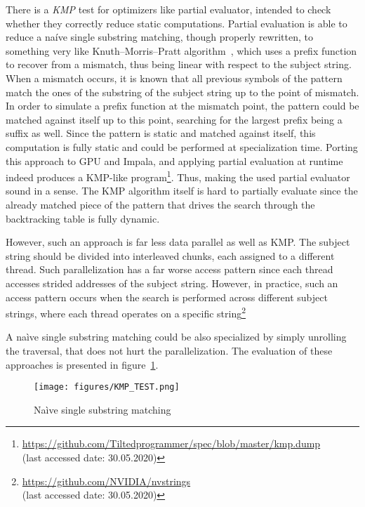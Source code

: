 There is a \emph{KMP} test for optimizers like partial evaluator,
intended to check whether they correctly reduce static computations.
Partial evaluation is able to reduce a na\'ive single substring matching,
though properly rewritten, to something very like Knuth--Morris--Pratt algorithm~\cite{KMP-Danvy},
which uses a prefix function to recover from a mismatch, thus being linear with
respect to the subject string.
When a mismatch occurs, it is known that all previous symbols of the pattern
match the ones of the substring of the subject string up to the point of mismatch.
In order to simulate a prefix function at the mismatch point, the pattern could be
matched against itself up to this point, searching for the largest prefix being a
suffix as well.
Since the pattern is static and matched against itself, this computation is fully static
and could be performed at specialization time.
Porting this approach to GPU and Impala, and applying partial evaluation
at runtime indeed produces a KMP-like program\footnote{\url{https://github.com/Tiltedprogrammer/spec/blob/master/kmp.dump}\\ (last accessed date: 30.05.2020)}.
Thus, making the used partial evaluator sound in a sense. The KMP algorithm itself is hard to partially evaluate since the already matched piece of the pattern
that drives the search through the backtracking table is fully dynamic.

However, such an approach is far less data parallel as well as KMP. The subject
string should be divided into interleaved chunks, each assigned to a different
thread. Such parallelization has a far worse access pattern since each
thread accesses strided addresses of the subject string.
However, in practice, such an access pattern occurs when the search is performed
across different subject strings, where each thread operates on a
specific string\footnote{\url{https://github.com/NVIDIA/nvstrings} \\(last accessed date: 30.05.2020)}

A na\`ive single substring matching could be also specialized by simply unrolling
the traversal, that does not hurt the parallelization.
The evaluation of these approaches is presented in figure~\ref{fig:kmp_test}.

\begin{figure}
    \centering
    \texttt{[image: figures/KMP\_TEST.png]}
    \caption{Na\`ive single substring matching}
    \label{fig:kmp_test}
\end{figure}

